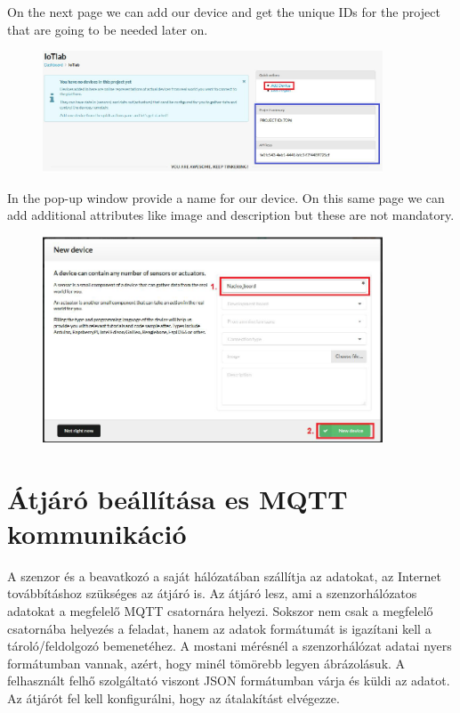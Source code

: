 \documentclass[a4paper]{article}
\begin{document}
On the next page we can add our device and get the unique IDs for the project that are going to be needed later on.

\begin{figure}[H]
    \centering
    \includegraphics[width=0.9\textwidth]{figures/devicehub-adddevice.png}
\end{figure}

In the pop-up window provide a name for our device. On this same page we can add additional attributes like image and
description but these are not mandatory.

\begin{figure}[H]
    \centering
    \includegraphics[width=0.9\textwidth]{figures/devicehub-newdevice.png}
\end{figure}

\section{Átjáró beállítása es MQTT kommunikáció}

A szenzor és a beavatkozó a saját hálózatában szállítja az adatokat, az Internet továbbításhoz szükséges az átjáró is.
Az átjáró lesz, ami a szenzorhálózatos adatokat a megfelelő MQTT csatornára helyezi. Sokszor nem csak a megfelelő
csatornába helyezés a feladat, hanem az adatok formátumát is igazítani kell a tároló/feldolgozó bemenetéhez. A mostani
mérésnél a szenzorhálózat adatai nyers formátumban vannak, azért, hogy minél tömörebb legyen ábrázolásuk. A felhasznált
felhő szolgáltató viszont JSON formátumban várja és küldi az adatot. Az átjárót fel kell konfigurálni, hogy az
átalakítást elvégezze.
\end{document}
